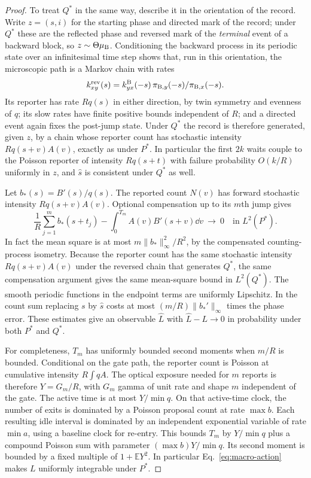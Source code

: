 \begin{proof}
To treat $Q^*$ in the same way, describe it in the orientation of the record. Write $z=(s,i)$ for the starting phase and directed mark of the record; under $Q^*$ these are the reflected phase and reversed mark of the \emph{terminal} event of a backward block, so $z\sim\Theta\mu_\mathrm B$. Conditioning the backward process in its periodic state over an infinitesimal time step shows that, run in this orientation, the microscopic path is a Markov chain with rates
\[
 k_{xy}^{\rm rev}(s)=
 k_{yx}^{\mathrm B}(-s)\,\pi_{\mathrm B,y}(-s)/\pi_{\mathrm B,x}(-s).
\]
Its reporter has rate $Rq(s)$ in either direction, by twin symmetry and evenness of $q$; its slow rates have finite positive bounds independent of $R$; and a directed event again fixes the post-jump state. Under $Q^*$ the record is therefore generated, given $z$, by a chain whose reporter count has stochastic intensity $Rq(s+v)A(v)$, exactly as under $P^*$. In particular the first $2k$ waits couple to the Poisson reporter of intensity $Rq(s+t)$ with failure probability $O(k/R)$ uniformly in $z$, and $\widehat s$ is consistent under $Q^*$ as well.

Let $b_*(s)=B'(s)/q(s)$. The reported count $N(v)$ has forward stochastic intensity $Rq(s+v)A(v)$. Optional compensation up to its $m$th jump gives
\[
 \frac1R\sum_{j=1}^m b_*(s+t_j)
  -\int_0^{T_m} A(v)B'(s+v)\dd v
  \ \longrightarrow\ 0\quad\text{in }L^2(P^*).
\]
In fact the mean square is at most $m\|b_*\|_\infty^2/R^2$, by the compensated counting-process isometry. Because the reporter count has the same stochastic intensity $Rq(s+v)A(v)$ under the reversed chain that generates $Q^*$, the same compensation argument gives the same mean-square bound in $L^2(Q^*)$. The smooth periodic functions in the endpoint terms are uniformly Lipschitz. In the count sum replacing $s$ by $\widehat s$ costs at most $(m/R)\|b_*'\|_\infty$ times the phase error. These estimates give an observable $\widehat L$ with $\widehat L-L\to0$ in probability under both $P^*$ and $Q^*$.

For completeness, $T_m$ has uniformly bounded second moments when $m/R$ is bounded. Conditional on the gate path, the reporter count is Poisson at cumulative intensity $R\int qA$. The optical exposure needed for $m$ reports is therefore $Y=G_m/R$, with $G_m$ gamma of unit rate and shape $m$ independent of the gate. The active time is at most $Y/\min q$. On that active-time clock, the number of exits is dominated by a Poisson proposal count at rate $\max b$. Each resulting idle interval is dominated by an independent exponential variable of rate $\min a$, using a baseline clock for re-entry. This bounds $T_m$ by $Y/\min q$ plus a compound Poisson sum with parameter $(\max b)Y/\min q$. Its second moment is bounded by a fixed multiple of $1+\mathbb E Y^2$. In particular Eq.~\eqref{eq:macro-action} makes $L$ uniformly integrable under $P^*$.


\end{proof}
